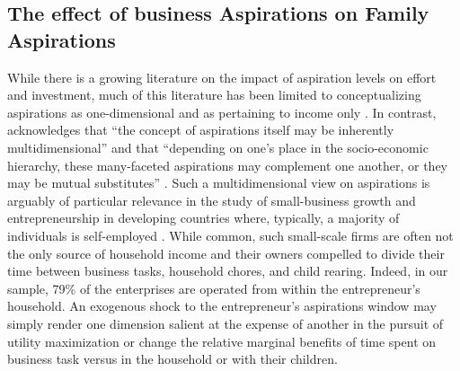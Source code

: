 \documentclass[11.5pt]{article}
\begin{document}

\subsection{The effect of business Aspirations on Family Aspirations}

While there is a growing literature on the impact of aspiration levels on effort and investment, much of this literature has been limited to conceptualizing aspirations as one-dimensional and as pertaining to income only \citep[see, e.g.,][]{Janzen2017, McBride2010, Stutzer2004, Knight2012}. In contrast, \citet{Ray2003, Ray2006} acknowledges that ``the concept of aspirations itself may be inherently multidimensional'' and that ``depending on one's place in the socio-economic hierarchy, these many-faceted aspirations may complement one another, or they may be mutual substitutes'' \citep[][p.2]{Ray2003}. Such a multidimensional view on aspirations is arguably of particular relevance in the study of small-business growth and entrepreneurship in developing countries where, typically, a majority of individuals is self-employed \citep[e.g.][]{Maloney2004, Gollin2008, Nichter2009}. While common, such small-scale firms are often not the only source of household income and their owners compelled to divide their time between business tasks, household chores, and child rearing. Indeed, in our sample, 79\% of the enterprises are operated from within the entrepreneur's household. An exogenous shock to the entrepreneur's aspirations window may simply render one dimension salient at the expense of another in the pursuit of utility maximization or change the relative marginal benefits of time spent on business task versus in the household or with their children.
\end{document}
